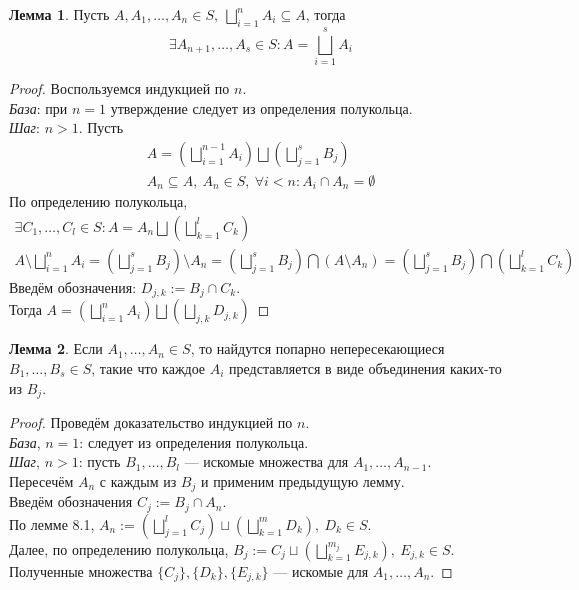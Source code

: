 \documentclass[11pt,a4paper]{report}
\theoremstyle{definition}
\theoremstyle{definition}
\newtheorem{lemma}{Лемма}[section]
\theoremstyle{definition}
\begin{document}
	\begin{lemma}
		Пусть $ A, A_{1}, \dots, A_{n} \in S,\ \bigsqcup_{i=1}^{n}{A_{i}} \subseteq A $, тогда 
		\[ \exists A_{n+1}, \dots, A_{s} \in S: A = \bigsqcup_{i=1}^{s}{A_{i}} \]
	\end{lemma}
	\begin{proof}
		Воспользуемся индукцией по $ n $.\\
		\textit{База}: при $ n = 1 $ утверждение следует из определения полукольца.\\
		\textit{Шаг}: $ n > 1 $. Пусть 
		\begin{gather*} 
			A = \left (\bigsqcup_{i=1}^{n-1}{A_{i}}\right ) \bigsqcup \left (\bigsqcup_{j=1}^{s}{B_{j}}\right )\\
			A_{n} \subseteq A,\ A_{n} \in S,\ \forall i < n: A_{i} \cap A_{n} = \emptyset
		\end{gather*}
		По определению полукольца,
		\begin{gather*}
			\exists C_{1}, \dots, C_{l} \in S: A = A_{n} \bigsqcup \left (\bigsqcup_{k=1}^{l}{C_{k}}\right )\\
			A \setminus \bigsqcup_{i=1}^{n}{A_{i}} = \left (\bigsqcup_{j=1}^{s}{B_{j}}\right ) \setminus A_{n} = \left (\bigsqcup_{j=1}^{s}{B_{j}}\right ) \bigcap \left (A \setminus A_{n}\right ) = \left (\bigsqcup_{j=1}^{s}{B_{j}}\right ) \bigcap  \left (\bigsqcup_{k=1}^{l}{C_{k}}\right )
		\end{gather*}
		Введём обозначения: $ D_{j, k} := B_{j} \cap C_{k} $.\\
		Тогда $ A = \left (\bigsqcup\limits_{i=1}^{n}{A_{i}}\right ) \bigsqcup \left (\bigsqcup\limits_{j, k} D_{j, k}\right ) $
	\end{proof}
	\begin{lemma}
		Если $ A_{1}, \dots, A_{n} \in S $, то найдутся попарно непересекающиеся $ B_{1}, \dots, B_{s} \in S $, такие что каждое $ A_{i} $ представляется в виде объединения каких-то из $ B_{j} $.
	\end{lemma}
	\begin{proof}
		Проведём доказательство индукцией по $ n $.\\
		\textit{База}, $ n = 1 $: следует из определения полукольца.\\
		\textit{Шаг}, $ n > 1 $: пусть $ B_{1}, \dots, B_{l} $ — искомые множества для $ A_{1}, \dots, A_{n-1} $.\\
		Пересечём $ A_{n} $ с каждым из $ B_{j} $ и применим предыдущую лемму.\\
		Введём обозначения $ C_{j} := B_{j} \cap A_{n} $.\\
		По лемме 8.1, $ A_{n} := (\bigsqcup_{j=1}^{l} C_{j}) \sqcup (\bigsqcup_{k=1}^{m} D_{k}),\ D_{k} \in S $.\\ 
		Далее, по определению полукольца, $ B_{j} := C_{j} \sqcup (\bigsqcup_{k=1}^{m_{j}}{E_{j, k}}),\ E_{j, k} \in S $.\\
		Полученные множества $ \{C_{j}\}, \{D_{k}\}, \{E_{j, k}\} $ — искомые для $ A_{1}, \dots, A_{n} $.
	\end{proof}
\end{document}
